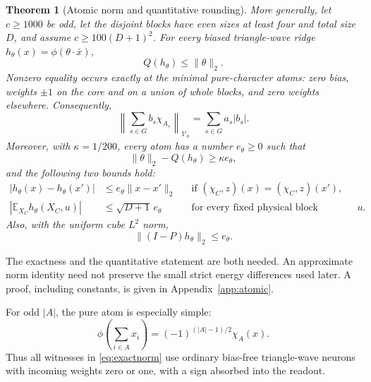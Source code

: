 \documentclass[11pt]{article}
\newtheorem{theorem}{Theorem}
\newcommand{\E}{\mathbb E}
\newcommand{\cV}{\mathcal V}
\begin{document}
\begin{theorem}[Atomic norm and quantitative rounding]\label{thm:atomic}
More generally, let $c\ge1000$ be odd, let the disjoint blocks have even
sizes at least four and total size $D$, and assume
$c\ge100(D+1)^2$. For every biased triangle-wave ridge
$h_\theta(x)=\phi(\theta\cdot\bar x)$,
\begin{equation}\label{eq:atomic}
 Q(h_\theta)\le\|\theta\|_2.
\end{equation}
Nonzero equality occurs exactly at the minimal pure-character atoms:
zero bias, weights $\pm1$ on the core and on a union of whole blocks,
and zero weights elsewhere. Consequently,
\begin{equation}\label{eq:exactnorm}
 \left\|\sum_{s\in G} b_s\chi_{A_s}\right\|_{\cV_\phi}
       =\sum_{s\in G}a_s|b_s|.
\end{equation}
Moreover, with $\kappa=1/200$, every atom has a number $e_\theta\ge0$
such that
\begin{equation}\label{eq:rounding}
 \|\theta\|_2-Q(h_\theta)\ge\kappa e_\theta,
\end{equation}
and the following two bounds hold:
\begin{align}
 |h_\theta(x)-h_\theta(x')|
   &\le e_\theta\|x-x'\|_2
   &&\text{if }(\chi_C,z)(x)=(\chi_C,z)(x'),\label{eq:fiberlip}\\
 |\E_{X_C}h_\theta(X_C,u)|
   &\le\sqrt{D+1}\,e_\theta
   &&\text{for every fixed physical block assignment }u.
   \label{eq:coremean}
\end{align}
Also, with the uniform cube $L^2$ norm,
\begin{equation}\label{eq:residualL2}
 \|(I-P)h_\theta\|_2\le e_\theta.
\end{equation}
\end{theorem}

The exactness and the quantitative statement are both needed. An
approximate norm identity need not preserve the small strict energy
differences used later. A proof, including constants, is given in
Appendix~\ref{app:atomic}.

For odd $|A|$, the pure atom is especially simple:
\begin{equation}\label{eq:pureparity}
 \phi\!\left(\sum_{i\in A}x_i\right)
       =(-1)^{(|A|-1)/2}\chi_A(x).
\end{equation}
Thus all witnesses in \eqref{eq:exactnorm} use ordinary bias-free
triangle-wave neurons with incoming weights zero or one, with a sign
absorbed into the readout.
\end{document}
